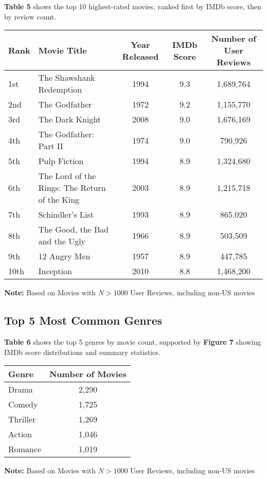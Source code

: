 \documentclass[11pt]{article}
\begin{document}
\textbf{Table 5} shows the top 10 highest-rated movies, ranked first by IMDb score, then by review count.

\begin{center}
\begin{tabular}{p{0.75cm}p{5cm}ccc}
\toprule
Rank & Movie Title & Year Released & IMDb Score & Number of User Reviews \\
\midrule
1st & The Shawshank Redemption  & 1994 & 9.3 & 1,689,764 \\
2nd & The Godfather  & 1972 & 9.2 & 1,155,770 \\
3rd & The Dark Knight  & 2008 & 9.0 & 1,676,169 \\
4th & The Godfather: Part II  & 1974 & 9.0 & 790,926 \\
5th & Pulp Fiction  & 1994 & 8.9 & 1,324,680 \\
6th & The Lord of the Rings: The Return of the King  & 2003 & 8.9 & 1,215,718 \\
7th & Schindler's List  & 1993 & 8.9 & 865,020 \\
8th & The Good, the Bad and the Ugly  & 1966 & 8.9 & 503,509 \\
9th & 12 Angry Men  & 1957 & 8.9 & 447,785 \\
10th & Inception  & 2010 & 8.8 & 1,468,200 \\
\bottomrule
\end{tabular}

\begin{tablenotes}
    \centering
    \small
    \item \textbf{Note:} Based on Movies with $N > 1000$ User Reviews, including non-US movies
\end{tablenotes}
\end{center}

\subsection{Top 5 Most Common Genres}

\textbf{Table 6} shows the top 5 genres by movie count, supported by \textbf{Figure 7} showing IMDb score distributions and summary statistics.

\begin{center}
\begin{tabular}{p{5cm}c}
\toprule
Genre & Number of Movies \\
\midrule
Drama & 2,290 \\
Comedy & 1,725 \\
Thriller & 1,269 \\
Action & 1,046 \\
Romance & 1,019 \\
\bottomrule
\end{tabular}

\begin{tablenotes}
    \centering
    \small
    \item \textbf{Note:} Based on Movies with $N > 1000$ User Reviews, including non-US movies
\end{tablenotes}
\end{center}
\end{document}
